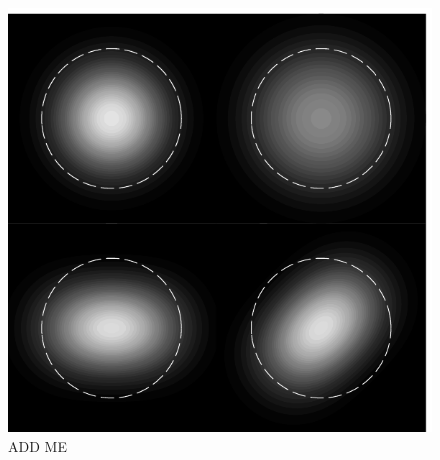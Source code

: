 \begin{figure}
  \begin{center}
  \leavevmode
  \includegraphics{figs-ap-notes/secondordermodes.pdf}
  \end{center}
  \caption[ADD ME]{ADD ME}
  \label{fig:secondordermodes}
\end{figure}
